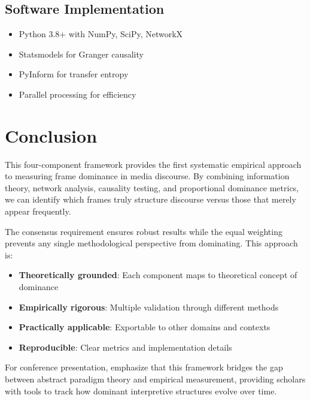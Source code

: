\documentclass[11pt]{article}
\begin{document}
\subsection{Software Implementation}
\begin{itemize}
    \item Python 3.8+ with NumPy, SciPy, NetworkX
    \item Statsmodels for Granger causality
    \item PyInform for transfer entropy
    \item Parallel processing for efficiency
\end{itemize}

\section{Conclusion}

This four-component framework provides the first systematic empirical approach to measuring frame dominance in media discourse. By combining information theory, network analysis, causality testing, and proportional dominance metrics, we can identify which frames truly structure discourse versus those that merely appear frequently.

The consensus requirement ensures robust results while the equal weighting prevents any single methodological perspective from dominating. This approach is:
\begin{itemize}
    \item \textbf{Theoretically grounded}: Each component maps to theoretical concept of dominance
    \item \textbf{Empirically rigorous}: Multiple validation through different methods
    \item \textbf{Practically applicable}: Exportable to other domains and contexts
    \item \textbf{Reproducible}: Clear metrics and implementation details
\end{itemize}

For conference presentation, emphasize that this framework bridges the gap between abstract paradigm theory and empirical measurement, providing scholars with tools to track how dominant interpretive structures evolve over time.
\end{document}

